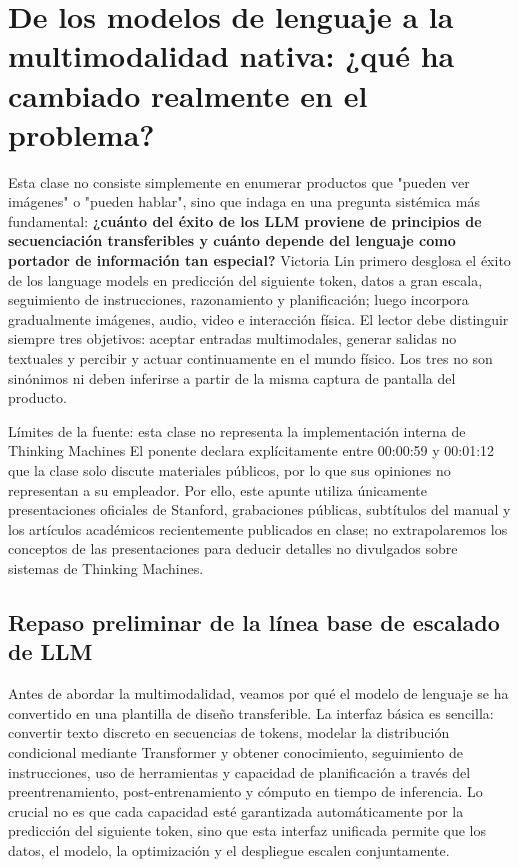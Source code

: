 \section{De los modelos de lenguaje a la multimodalidad nativa: ¿qué ha cambiado realmente en el problema?}

Esta clase no consiste simplemente en enumerar productos que "pueden ver imágenes" o "pueden hablar", sino que indaga en una pregunta sistémica más fundamental: \textbf{¿cuánto del éxito de los LLM proviene de principios de secuenciación transferibles y cuánto depende del lenguaje como portador de información tan especial?} Victoria Lin primero desglosa el éxito de los language models en predicción del siguiente token, datos a gran escala, seguimiento de instrucciones, razonamiento y planificación; luego incorpora gradualmente imágenes, audio, video e interacción física. El lector debe distinguir siempre tres objetivos: aceptar entradas multimodales, generar salidas no textuales y percibir y actuar continuamente en el mundo físico. Los tres no son sinónimos ni deben inferirse a partir de la misma captura de pantalla del producto.

\begin{warningbox}{Límites de la fuente: esta clase no representa la implementación interna de Thinking Machines}
El ponente declara explícitamente entre 00:00:59 y 00:01:12 que la clase solo discute materiales públicos, por lo que sus opiniones no representan a su empleador. Por ello, este apunte utiliza únicamente presentaciones oficiales de Stanford, grabaciones públicas, subtítulos del manual y los artículos académicos recientemente publicados en clase; no extrapolaremos los conceptos de las presentaciones para deducir detalles no divulgados sobre sistemas de Thinking Machines.
\end{warningbox}

\subsection{Repaso preliminar de la línea base de escalado de LLM}

Antes de abordar la multimodalidad, veamos por qué el modelo de lenguaje se ha convertido en una plantilla de diseño transferible. La interfaz básica es sencilla: convertir texto discreto en secuencias de tokens, modelar la distribución condicional mediante Transformer y obtener conocimiento, seguimiento de instrucciones, uso de herramientas y capacidad de planificación a través del preentrenamiento, post-entrenamiento y cómputo en tiempo de inferencia. Lo crucial no es que cada capacidad esté garantizada automáticamente por la predicción del siguiente token, sino que esta interfaz unificada permite que los datos, el modelo, la optimización y el despliegue escalen conjuntamente.

